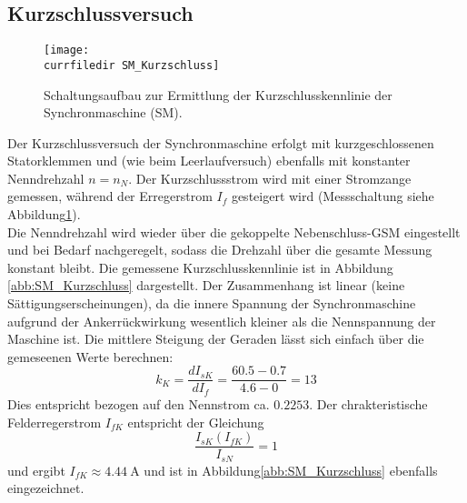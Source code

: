 \subsection{Kurzschlussversuch}
\begin{figure}
    \centering
    \texttt{[image: \\currfiledir SM\_Kurzschluss]}
    \caption{Schaltungsaufbau zur Ermittlung der Kurzschlusskennlinie der Synchronmaschine (SM).}
    \label{fig:SM_Kurzschluss}
\end{figure}
Der Kurzschlussversuch der Synchronmaschine erfolgt mit kurzgeschlossenen Statorklemmen und (wie beim Leerlaufversuch) ebenfalls mit konstanter Nenndrehzahl $n=n_N$. Der Kurzschlussstrom wird mit einer Stromzange gemessen, während der Erregerstrom $I_f$ gesteigert wird (Messschaltung siehe Abbildung\;\ref{fig:SM_Kurzschluss}).\\
Die Nenndrehzahl wird wieder über die gekoppelte Nebenschluss-GSM eingestellt und bei Bedarf nachgeregelt, sodass die Drehzahl über die gesamte Messung konstant bleibt. Die gemessene Kurzschlusskennlinie ist in Abbildung \ref{abb:SM_Kurzschluss} dargestellt. Der Zusammenhang ist linear (keine Sättigungserscheinungen), da die innere Spannung der Synchronmaschine aufgrund der Ankerrückwirkung wesentlich kleiner als die Nennspannung der Maschine ist. Die mittlere Steigung der Geraden lässt sich einfach über die gemeseenen Werte berechnen:
\begin{equation*}
    k_K = \frac{dI_{sK}}{dI_f} = \frac{60.5 - 0.7}{4.6 - 0} = 13
\end{equation*}
Dies entspricht bezogen auf den Nennstrom ca. $0.2253$. Der chrakteristische Felderregerstrom $I_{fK}$ entspricht der Gleichung 
\begin{equation*}
    \frac{I_{sK}(I_{fK})}{I_{sN}} = 1
\end{equation*}
und ergibt $I_{fK} \approx \SI{4.44}{\ampere}$ und ist in Abbildung\;\ref{abb:SM_Kurzschluss} ebenfalls eingezeichnet.

